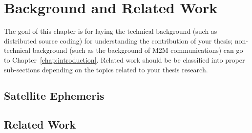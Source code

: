 \chapter{Background and Related Work}
\label{chap:background}

The goal of this chapter is for laying the technical background (such as distributed source coding) for understanding the contribution of your thesis; non-technical background (such as the background of M2M communications) can go to Chapter~\ref{chap:introduction}.
%
Related work should be be classified into proper sub-sections depending on the topics
related to your thesis research.

\section{Satellite Ephemeris}


\section{Related Work}
